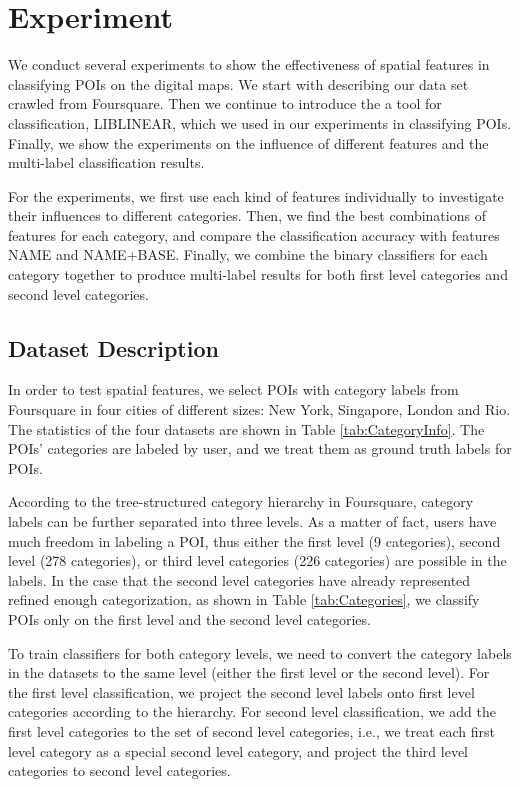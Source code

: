 \section{Experiment}
\label{chp:experiment}
We conduct several experiments to show the effectiveness
of spatial features in classifying POIs on the digital maps.
We start with describing our data set crawled from Foursquare.
Then we continue to introduce the a tool for classification, LIBLINEAR\cite{liblinear},
which we used in our experiments in classifying POIs. Finally, we
show the experiments on the influence of different features and 
the multi-label classification results.

For the experiments, we first use each kind of features
individually to investigate their influences to different categories.
Then, we find the best combinations of features for each category,
and compare the classification accuracy with features NAME and NAME+BASE.
Finally, we combine the binary classifiers for each category together to
produce multi-label results for both first level categories
and second level categories.

\subsection{Dataset Description}
\label{sec1}
In order to test spatial features, we select POIs with category labels
from Foursquare in four cities of different sizes: New York, Singapore,
London and Rio. The statistics of the four datasets are shown in Table \ref{tab:CategoryInfo}.
The POIs' categories are labeled by user, and we treat them as ground truth labels for POIs.

According to the tree-structured category hierarchy in Foursquare,
category labels can be further separated into three levels.
As a matter of fact, users have much freedom in labeling a POI,
thus either the first level (9 categories), second level (278 categories),
or third level categories (226 categories) are possible in the labels.
In the case that the second level categories have already represented
refined enough categorization, as shown in Table \ref{tab:Categories},
we classify POIs only on the first level and the second level categories.

To train classifiers for both category levels, we need to convert the
category labels in the datasets to the same level (either the first level or the second level).
For the first level classification, we project the second level labels onto first level categories
according to the hierarchy. For second level classification, we add the
first level categories to the set of second level categories, i.e.,
we treat each first level category as a special second level category,
and project the third level categories to second level categories.

